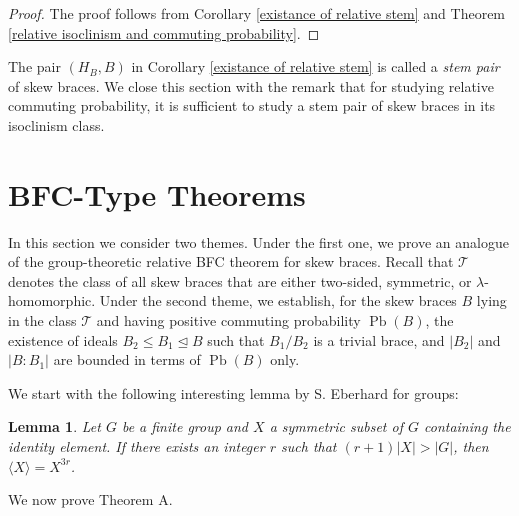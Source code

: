 \documentclass[10pt,a4paper]{amsart}
\numberwithin{equation}{section}
\newtheorem{lem}[equation]{Lemma}
\newcommand{\Pb}{\operatorname{Pb} }
\newcommand{\normaleq}{\trianglelefteq}
\begin{document}
\begin{proof}
    The proof follows from Corollary \ref{existance of relative stem} and Theorem \ref{relative isoclinism and commuting probability}.
\end{proof}


The pair $(H_B,B)$ in Corollary \ref{existance of relative stem} is called a \emph{stem pair} of skew braces. We close this section with the remark that for studying relative commuting probability, it is sufficient to study a stem pair of skew braces in its isoclinism class.




  
\section{ BFC-Type Theorems}
 
In this section we consider two themes. Under the first one, we prove an analogue of the group-theoretic relative BFC theorem for skew braces. Recall that $\mathcal{T}$ denotes the class of all skew braces that are either two-sided, symmetric, or $\lambda$-homomorphic. Under the second theme, we establish, for the skew braces $B$ lying in the class $\mathcal{T}$ and having positive commuting probability $\Pb(B)$, the existence of ideals $B_2 \leqslant B_1 \normaleq B$ such that $B_1/B_2$ is a trivial brace, and $|B_2|$ and $|B:B_1|$ are bounded in terms of $\Pb(B)$ only.  

 We start with the following interesting lemma by S. Eberhard \cite{SE15} for groups:
\begin{lem}\label{Eb-lem}
 Let $G$ be a finite group and $X$ a symmetric subset of $G$ containing the identity element. If there exists an integer $r$ such that  $(r + 1)|X|>|G|$, then $\langle X\rangle=X^{3r}$.
\end{lem}

We now prove Theorem A.
\end{document}
